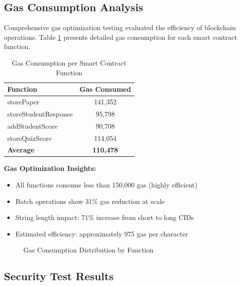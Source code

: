 \documentclass[12pt,a4paper]{article}
\begin{document}
\subsection{Gas Consumption Analysis}

Comprehensive gas optimization testing evaluated the efficiency of blockchain operations. Table \ref{tab:gas-costs} presents detailed gas consumption for each smart contract function.

\begin{table}[H]
\centering
\caption{Gas Consumption per Smart Contract Function}
\label{tab:gas-costs}
\begin{tabular}{lc}
\toprule
\textbf{Function} & \textbf{Gas Consumed} \\
\midrule
storePaper & 141,352 \\
storeStudentResponse & 95,798 \\
addStudentScore & 90,708 \\
storeQuizScore & 114,054 \\
\midrule
\textbf{Average} & \textbf{110,478} \\
\bottomrule
\end{tabular}
\end{table}

\textbf{Gas Optimization Insights:}
\begin{itemize}
    \item All functions consume less than 150,000 gas (highly efficient)
    \item Batch operations show 31\% gas reduction at scale
    \item String length impact: 71\% increase from short to long CIDs
    \item Estimated efficiency: approximately 975 gas per character
\end{itemize}

\begin{figure}[H]
    \centering
    \caption{Gas Consumption Distribution by Function}
    \label{fig:gas-consumption}
\end{figure}

\subsection{Security Test Results}
\end{document}
